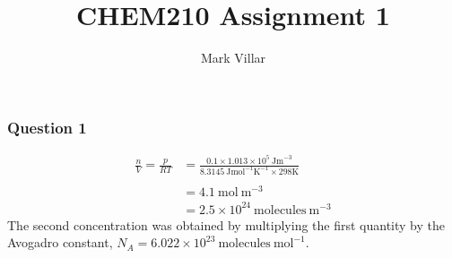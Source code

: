 \documentclass[11pt,a4paper]{article}
\title{CHEM210 \hfill Assignment 1}
\author{Mark Villar}
\begin{document}
\maketitle

\subsubsection*{Question 1}
	\begin{align*}
		\frac{n}{V} = \frac{p}{RT} &= \frac{0.1 \times 1.013 \times 10^5 \ \text{Jm}^{-3}}{8.3145 \ \text{Jmol}^{-1} \text{K}^{-1}\times 298 \text{K}                                                                                                                                                                                                                                                                                                                                                                                                                                                                                                                                                        		} \\
		\\
 		&= 4.1 \ \text{mol} \ \text{m}^{-3} \\
		&= 2.5 \times 10^{24} \ \text{molecules} \  \text{m}^{-3}
	\end{align*}
	The second concentration was obtained by multiplying the first quantity by the Avogadro constant, $N_A= 6.022 \times 10^{23} \ \text{molecules} \ \text{mol}^{-1}$. \\
	
\end{document}
